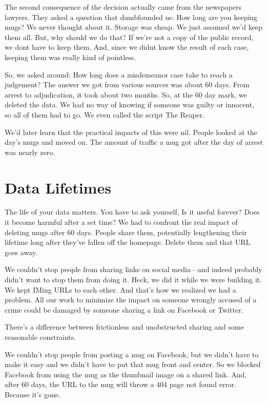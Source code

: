 \documentclass[
  letterpaper,
  DIV=11,
  numbers=noendperiod]{scrreprt}
\begin{document}
The second consequence of the decision actually came from the newspapers
lawyers. They asked a question that dumbfounded us: How long are you
keeping mugs? We never thought about it. Storage was cheap. We just
assumed we'd keep them all. But, why should we do that? If we're not a
copy of the public record, we dont have to keep them. And, since we
didnt know the result of each case, keeping them was really kind of
pointless.

So, we asked around: How long does a misdemeanor case take to reach a
judgement? The answer we got from various sources was about 60 days.
From arrest to adjudication, it took about two months. So, at the 60 day
mark, we deleted the data. We had no way of knowing if someone was
guilty or innocent, so all of them had to go. We even called the script
The Reaper.

We'd later learn that the practical impacts of this were nil. People
looked at the day's mugs and moved on. The amount of traffic a mug got
after the day of arrest was nearly zero.

\hypertarget{data-lifetimes}{%
\section{Data Lifetimes}\label{data-lifetimes}}

The life of your data matters. You have to ask yourself, Is it useful
forever? Does it become harmful after a set time? We had to confront the
real impact of deleting mugs after 60 days. People share them,
potentially lengthening their lifetime long after they've fallen off the
homepage. Delete them and that URL goes away.

We couldn't stop people from sharing links on social media---and indeed
probably didn't want to stop them from doing it. Heck, we did it while
we were building it. We kept IMing URLs to each other. And that's how we
realized we had a problem. All our work to minimize the impact on
someone wrongly accused of a crime could be damaged by someone sharing a
link on Facebook or Twitter.

There's a difference between frictionless and unobstructed sharing and
some reasonable constraints.

We couldn't stop people from posting a mug on Facebook, but we didn't
have to make it easy and we didn't have to put that mug front and
center. So we blocked Facebook from using the mug as the thumbnail image
on a shared link. And, after 60 days, the URL to the mug will throw a
404 page not found error. Because it's gone.
\end{document}
